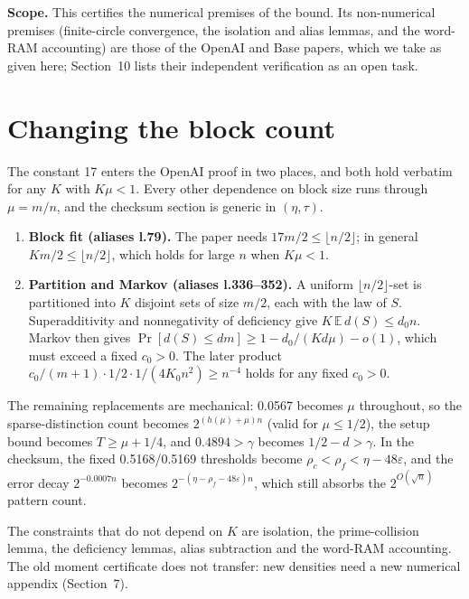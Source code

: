 \documentclass[11pt]{article}
\newcommand{\E}{\mathbb{E}}
\newcommand{\eps}{\varepsilon}
\theoremstyle{plain}
\begin{document}
\textbf{Scope.} This certifies the numerical premises of the bound. Its non-numerical premises (finite-circle convergence, the isolation and alias lemmas, and the word-RAM accounting) are those of the OpenAI and Base papers, which we take as given here; Section~10 lists their independent verification as an open task.

\section{Changing the block count}

The constant 17 enters the OpenAI proof in two places, and both hold verbatim for any $K$ with $K\mu < 1$. Every other dependence on block size runs through $\mu = m/n$, and the checksum section is generic in $(\eta, \tau)$.

\begin{enumerate}
\item \textbf{Block fit (aliases l.79).} The paper needs $17 m/2 \le \lfloor n/2 \rfloor$; in general $K m/2 \le \lfloor n/2 \rfloor$, which holds for large $n$ when $K\mu < 1$.
\item \textbf{Partition and Markov (aliases l.336--352).} A uniform $\lfloor n/2 \rfloor$-set is partitioned into $K$ disjoint sets of size $m/2$, each with the law of $S$. Superadditivity and nonnegativity of deficiency give $K\, \E\, d(S) \le d_0 n$. Markov then gives $\Pr[d(S) \le d m] \ge 1 - d_0/(K d \mu) - o(1)$, which must exceed a fixed $c_0 > 0$. The later product $c_0/(m+1) \cdot 1/2 \cdot 1/(4 K_0 n^2) \ge n^{-4}$ holds for any fixed $c_0 > 0$.
\end{enumerate}

The remaining replacements are mechanical: 0.0567 becomes $\mu$ throughout, so the sparse-distinction count becomes $2^{(h(\mu)+\mu)n}$ (valid for $\mu \le 1/2$), the setup bound becomes $T \ge \mu + 1/4$, and $0.4894 > \gamma$ becomes $1/2 - d > \gamma$. In the checksum, the fixed 0.5168/0.5169 thresholds become $\rho_c < \rho_f < \eta - 48\eps$, and the error decay $2^{-0.0007n}$ becomes $2^{-(\eta - \rho_f - 48\eps)n}$, which still absorbs the $2^{O(\sqrt{n})}$ pattern count.

The constraints that do not depend on $K$ are isolation, the prime-collision lemma, the deficiency lemmas, alias subtraction and the word-RAM accounting. The old moment certificate does not transfer: new densities need a new numerical appendix (Section~7).
\end{document}
